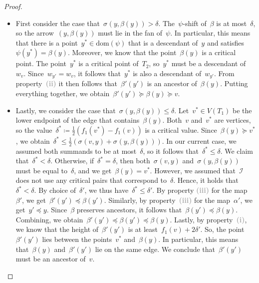 \documentclass[a4paper,UKenglish, autoref, thm-restate, cleveref]{lipics-v2021}
\newcommand{\dom}{\mathrm{dom}}
\newcommand{\shift}[1]{\sigma_{#1}}
\newcommand{\I}{\mathcal{I}}
\newcommand{\enumit}[1]{\textcolor{darkgray}{\sffamily\bfseries\upshape\mathversion{bold}#1}}
\begin{document}
\begin{proof}
	\begin{itemize}
		\item 
			First consider the case that~$\shift{}(y, \beta(y)) > \delta$.
            The~$\psi$-shift of~$\beta$ is at most~$\delta$, so the arrow~$(y, \beta(y))$ must lie in the fan of~$\psi$.
            In particular, this means that there is a point~$y^* \in \dom(\psi)$ that is a descendant of~$y$ and satisfies~$\psi(y^*) = \beta(y)$.
            Moreover, we know that the point~$\beta(y)$ is a critical point.
            The point~$y^*$ is a critical point of~$T_2$, so~$y^*$ must be a descendant of~$w_v$.
            Since~$w_{y'} = w_v$, it follows that~$y^*$ is also a descendant of~$w_{y'}$.
            From property~\enumit{(ii)} it then follows that~$\beta'(y')$ is an ancestor of~$\beta(y)$.
            Putting everything together, we obtain~$\beta'(y') \succeq \beta(y) \succeq v$.
		\item
			Lastly, we consider the case that~$\shift{}(y, \beta(y)) \le \delta$.
            Let~$v^* \in V(T_1)$ be the lower endpoint of the edge that contains~$\beta(y)$.
			Both~$v$ and~$v^*$ are vertices, so the value~$\delta^* \coloneqq \tfrac{1}{2}(f_1(v^*) - f_1(v))$ is a critical value.
            Since~$\beta(y) \succeq v^*$, we obtain~$\delta^* \le \tfrac{1}{2}(\shift{}(v, y) + \shift{}(y, \beta(y)))$.
			In our current case, we assumed both summands to be at most~$\delta$, so it follows that~$\delta^* \le \delta$.
            We claim that~$\delta^* < \delta$.
            Otherwise, if~$\delta^* = \delta$, then both~$\shift{}(v, y)$ and~$\shift{}(y, \beta(y))$ must be equal to~$\delta$, and we get~$\beta(y) = v^*$.
            However, we assumed that~$\I$ does not use any critical pairs that correspond to~$\delta$.
            Hence, it holds that~$\delta^* < \delta$.
			By choice of~$\delta'$, we thus have~$\delta^* \le \delta'$.
			By property \enumit{(iii)} for the map~$\beta'$, we get~$\beta'(y') \preceq \beta(y')$.
            Similarly, by property~\enumit{(iii)} for the map~$\alpha'$, we get~$y' \preceq y$.
            Since~$\beta$ preserves ancestors, it follows that~$\beta(y') \preceq \beta(y)$.
            Combining, we obtain~$\beta'(y') \preceq \beta(y') \preceq \beta(y)$.
			Lastly, by property~\enumit{(i)}, we know that the height of~$\beta'(y')$ is at least~$f_1(v) + 2\delta'$.
			So, the point~$\beta'(y')$ lies between the points~$v^*$ and~$\beta(y)$.
            In particular, this means that~$\beta(y)$ and~$\beta'(y')$ lie on the same edge.
            We conclude that~$\beta'(y')$ must be an ancestor of~$v$.
	\end{itemize}


\end{proof}
\end{document}
